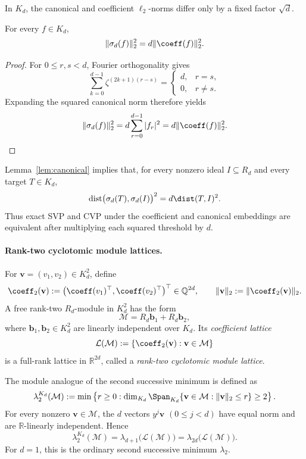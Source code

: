 In $K_d$, the canonical and coefficient
\(\ell_2\)-norms differ only by a fixed factor \(\sqrt d\).

\begin{lemma}
\label{lem:canonical}
For every $f\in K_d$,
\[\|\sigma_d(f)\|_2^2=d\|\coeff(f)\|_2^2.\]
\end{lemma}

\begin{proof}
For $0\leq r,s<d$, Fourier orthogonality gives
\[
  \sum_{k=0}^{d-1}\zeta^{(2k+1)(r-s)}
  =
  \begin{cases}
    d,&r=s,\\
    0,&r\neq s.
  \end{cases}
\]
Expanding the squared canonical norm therefore yields
\[\|\sigma_d(f)\|_2^2=d\sum_{r=0}^{d-1}|f_r|^2
=d\|\coeff(f)\|_2^2.\]
\end{proof}

\begin{remark}
Lemma~\ref{lem:canonical} implies that, for every nonzero ideal
$I\subseteq R_d$ and every target $T\in K_d$,
\[\operatorname{dist}\bigl(\sigma_d(T),\sigma_d(I)\bigr)^2
={d\dist(T,I)^2}.\]
Thus exact SVP and CVP under the coefficient and canonical embeddings are
equivalent after multiplying each squared threshold by $d$.
\end{remark}

\ifdefined\withModuleSIVP
\paragraph{Rank-two cyclotomic module lattices.}
For \(\mathbf v=(v_1,v_2)\in K_d^2\), define
\[
 \coeff_2(\mathbf v)
 :=\bigl(\coeff(v_1)^\top,\coeff(v_2)^\top\bigr)^\top
 \in\mathbb Q^{2d},
 \qquad
 \|\mathbf v\|_2:=\|\coeff_2(\mathbf v)\|_2.
\]
A free rank-two \(R_d\)-module in \(K_d^2\) has the form
\[
 \mathcal M=R_d\mathbf b_1+R_d\mathbf b_2,
\]
where \(\mathbf b_1,\mathbf b_2\in K_d^2\) are linearly independent over
\(K_d\).  Its \emph{coefficient lattice}
\[
 \mathcal L(\mathcal M)
 :=\{\coeff_2(\mathbf v):\mathbf v\in\mathcal M\}
\]
is a full-rank lattice in \(\mathbb R^{2d}\), called a
\emph{rank-two cyclotomic module lattice}.

The module analogue of the second successive minimum is defined as
\[
 \lambda_2^{K_d}(\mathcal M)
 :=\min\left\{r\geq0:
 \dim_{K_d}\Span_{K_d}
 \{\mathbf v\in\mathcal M:\|\mathbf v\|_2\leq r\}\geq2
 \right\}.
\]
For every nonzero \(\mathbf v\in\mathcal M\), the \(d\) vectors
\(y^j\mathbf v\) \((0\leq j<d)\) have equal norm and are
\(\mathbb R\)-linearly independent.  Hence
\[
 \lambda_2^{K_d}(\mathcal M)
 =\lambda_{d+1}\bigl(\mathcal L(\mathcal M)\bigr)
 =\lambda_{2d}\bigl(\mathcal L(\mathcal M)\bigr).
\]
For \(d=1\), this is the ordinary second successive minimum \(\lambda_2\).


